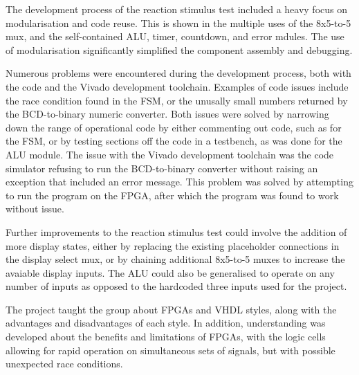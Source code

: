 \documentclass[11pt]{article}
\begin{document}
The development process of the reaction stimulus test included a heavy focus on modularisation and code reuse. This is shown in the multiple uses of the 8x5-to-5 mux, and the self-contained ALU, timer, countdown, and error mdules. The use of modularisation significantly simplified the component assembly and debugging.

Numerous problems were encountered during the development process, both with the code and the Vivado development toolchain. Examples of code issues include the race condition found in the FSM, or the unusally small numbers returned by the BCD-to-binary numeric converter. Both issues were solved by narrowing down the range of operational code by either commenting out code, such as for the FSM, or by testing sections off the code in a testbench, as was done for the ALU module. The issue with the Vivado development toolchain was the code simulator refusing to run the BCD-to-binary converter without raising an exception that included an error message. This problem was solved by attempting to run the program on the FPGA, after which the program was found to work without issue.

Further improvements to the reaction stimulus test could involve the addition of more display states, either by replacing the existing placeholder connections in the display select mux, or by chaining additional 8x5-to-5 muxes to increase the avaiable display inputs. The ALU could also be generalised to operate on any number of inputs as opposed to the hardcoded three inputs used for the project.

The project taught the group about FPGAs and VHDL styles, along with the advantages and disadvantages of each style. In addition, understanding was developed about the benefits and limitations of FPGAs, with the logic cells allowing for rapid operation on simultaneous sets of signals, but with possible unexpected race conditions.
\end{document}
